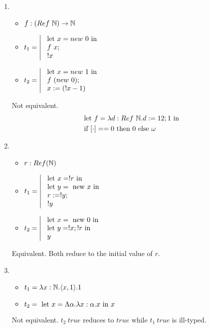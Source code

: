 \documentclass{article}
\begin{document}
\begin{enumerate}
    \item 
        \begin{itemize}
            \item $f:(Ref\ \mathbb N)\to\mathbb N$
            \item $t_1=\left|\begin{array}{l}\LET x= new\ 0 \TIN\\\ f\ x;\\\ !x\end{array}\right.$
            \item $t_2=\left|\begin{array}{l}\LET x= new\ 1 \TIN\\\ f\ (new\ 0);\\\ x:=(!x-1)\end{array}\right.$
        \end{itemize}
        Not equivalent.
        \begin{align*}
            & \LET f = \lam{d:Ref\ \N}{d:=12;1} \TIN \\
            & \IF [\cdot] == 0 \THEN 0 \ELSE \omega
        \end{align*}

    \item 
        \begin{itemize}
            \item $r:Ref(\mathbb N)$
            \item $t_1=\left|\begin{array}{l}\LET x=!r \TIN\\ \LET y=\NEW x \TIN\\\ r:=!y;\\\ !y\end{array}\right.$
            \item $t_2=\left|\begin{array}{l}\text{ let } x=\text{ new } 0 \text{ in } \\ \text{ let } y=!x;!r \text{ in }\\\ y\end{array}\right.$
        \end{itemize}
        Equivalent. Both reduce to the initial value of $r$.

    \item 
        \begin{itemize}
            \item $t_1 = \lam{x:\N}{\pair{x,1}}.1$
            \item $t_2 = \text{ let } x = \Lambda\alpha.\lambda x:\alpha.x\text{ in } x$
        \end{itemize}
        Not equivalent. $t_2\ true$ reduces to $true$ while $t_1\ true$ is ill-typed.
\end{enumerate}
\end{document}
